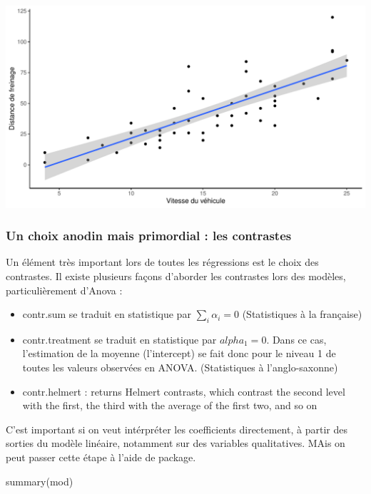 \documentclass[
]{article}
\newenvironment{Shaded}{\begin{snugshade}}{\end{snugshade}}
\newcommand{\FunctionTok}[1]{\textcolor[rgb]{0.00,0.00,0.00}{#1}}
\newcommand{\NormalTok}[1]{#1}
\providecommand{\tightlist}{%
  \setlength{\itemsep}{0pt}\setlength{\parskip}{0pt}}
\begin{document}
\includegraphics{Learning_R_files/figure-latex/unnamed-chunk-30-1.pdf}

\hypertarget{un-choix-anodin-mais-primordial-les-contrastes}{%
\subsubsection{Un choix anodin mais primordial : les
contrastes}\label{un-choix-anodin-mais-primordial-les-contrastes}}

Un élément très important lors de toutes les régressions est le choix
des contrastes. Il existe plusieurs façons d'aborder les contrastes lors
des modèles, particulièrement d'Anova :

\begin{itemize}
\tightlist
\item
  contr.sum se traduit en statistique par \(\sum_i\alpha_i=0\)
  (Statistiques à la française)
\item
  contr.treatment se traduit en statistique par \(alpha_1=0\). Dans ce
  cas, l'estimation de la moyenne (l'intercept) se fait donc pour le
  niveau 1 de toutes les valeurs observées en ANOVA. (Statistiques à
  l'anglo-saxonne)
\item
  contr.helmert : returns Helmert contrasts, which contrast the second
  level with the first, the third with the average of the first two, and
  so on
\end{itemize}

C'est important si on veut intérpréter les coefficients directement, à
partir des sorties du modèle linéaire, notamment sur des variables
qualitatives. MAis on peut passer cette étape à l'aide de package.

\begin{Shaded}
\begin{Highlighting}[]
\FunctionTok{summary}\NormalTok{(mod)}
\end{Highlighting}
\end{Shaded}
\end{document}
